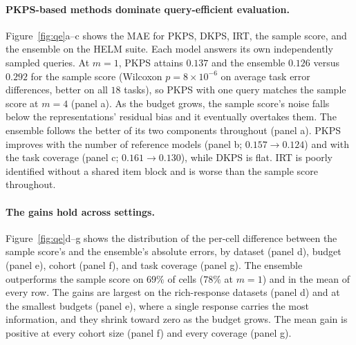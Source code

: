 \documentclass{article}
\theoremstyle{definition}
\theoremstyle{plain}
\newcommand{\PKPS}{PKPS\xspace}
\begin{document}
\paragraph{\PKPS-based methods dominate query-efficient evaluation.}
Figure~\ref{fig:qe}a--c shows the MAE for \PKPS, DKPS, IRT, the sample score, and
the ensemble on the HELM suite.
Each model answers its own independently sampled queries.
At $m{=}1$, \PKPS attains $0.137$ and the ensemble $0.126$ versus $0.292$ for the sample score (Wilcoxon $p{=}8\times10^{-6}$ on average task error differences, better on all $18$ tasks), so \PKPS with one query matches the sample score at $ m = 4 $ (panel a).
As the budget grows, the sample score's noise falls below the representations'
residual bias and it eventually overtakes them.
The ensemble follows the better of its two components
throughout (panel a).
\PKPS improves with the number of reference models
(panel b; $0.157\!\to\!0.124$) and with the task coverage (panel c; $0.161\!\to\!0.130$),
while DKPS is flat.
IRT is poorly identified without a shared item block and is worse than the sample
score throughout.

\paragraph{The gains hold across settings.}
Figure~\ref{fig:qe}d--g shows the distribution of the per-cell difference between
the sample score's and the ensemble's absolute errors, by dataset (panel d), budget (panel e),
cohort (panel f), and task coverage (panel g).
The ensemble outperforms the sample score on $69\%$ of cells ($78\%$ at $m{=}1$)
and in the mean of every row.
The gains are largest on the rich-response datasets (panel d) and at the smallest budgets
(panel e), where a single response carries the most information, and they shrink toward
zero as the budget grows.
The mean gain is positive at every cohort size (panel f) and every coverage (panel g).
\end{document}
